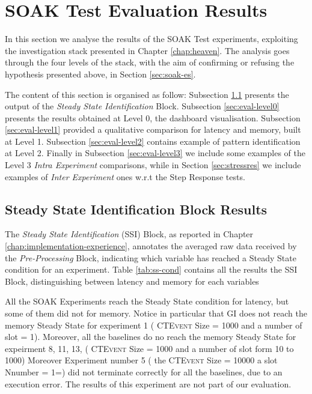 \section{SOAK Test Evaluation Results}\label{sec:soakres}

In this section we analyse the results of the SOAK Test experiments, exploiting the investigation stack presented in Chapter \ref{chap:heaven}. The analysis goes through the four levels of the stack, with the aim of confirming or refusing the hypothesis presented above, in Section \ref{sec:soak-es}. 

The content of this section is organised as follow: 
Subsection \ref{sec:eval-ssib} presents the output of the \textit{Steady State Identification} Block. 
Subsection \ref{sec:eval-level0} presents the results obtained at Level 0, the dashboard visualisation.  
Subsection \ref{sec:eval-level1} provided a qualitative comparison for latency and memory, built at Level 1. 
Subsection \ref{sec:eval-level2} contains example of pattern identification at Level 2. 
Finally in Subsection \ref{sec:eval-level3} we include some examples of the Level 3 \textit{Intra Experiment }comparisons, while in Section \ref{sec:stressres} we include examples of \textit{Inter Experiment }ones w.r.t the Step Response tests.


\subsection{Steady State Identification Block Results}\label{sec:eval-ssib}

The \textit{Steady State Identification} (SSI) Block, as reported in Chapter \ref{chap:implementation-experience}, annotates the averaged raw data received by the \textit{Pre-Processing} Block, indicating which variable has reached a Steady State condition for an experiment. Table \ref{tab:ss-cond} contains all the results the SSI Block, distinguishing between latency and memory for each variables





All the SOAK Experiments reach the Steady State condition for latency, but some of them did not for memory. Notice in particular that GI does not reach the memory Steady State for experiment 1 (  \textsc{CTEvent}  Size = 1000 and a number of slot = 1). Moreover, all the baselines do no reach the memory  Steady State for expeirment 8, 11, 13, ( \textsc{CTEvent}  Size = 1000 and a number of slot form 10 to 1000)  Moreover Experiment number 5 ( the \textsc{CTEvent} Size = 10000 a slot Nnumber = 1=) did not terminate correctly for all the baselines, due to an execution error. The results of this experiment are not part of our evaluation.

